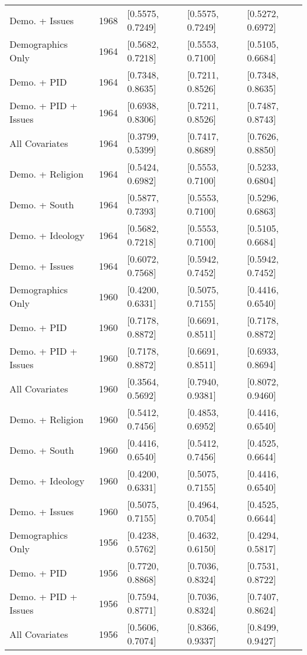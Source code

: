 \begin{longtable}{lrlll}
  Demo. + Issues & 1968 & [0.5575, 0.7249] & [0.5575, 0.7249] & [0.5272, 0.6972] \\ 
  Demographics Only & 1964 & [0.5682, 0.7218] & [0.5553, 0.7100] & [0.5105, 0.6684] \\ 
  Demo. + PID & 1964 & [0.7348, 0.8635] & [0.7211, 0.8526] & [0.7348, 0.8635] \\ 
  Demo. + PID + Issues & 1964 & [0.6938, 0.8306] & [0.7211, 0.8526] & [0.7487, 0.8743] \\ 
  All Covariates & 1964 & [0.3799, 0.5399] & [0.7417, 0.8689] & [0.7626, 0.8850] \\ 
  Demo. + Religion & 1964 & [0.5424, 0.6982] & [0.5553, 0.7100] & [0.5233, 0.6804] \\ 
  Demo. + South & 1964 & [0.5877, 0.7393] & [0.5553, 0.7100] & [0.5296, 0.6863] \\ 
  Demo. + Ideology & 1964 & [0.5682, 0.7218] & [0.5553, 0.7100] & [0.5105, 0.6684] \\ 
  Demo. + Issues & 1964 & [0.6072, 0.7568] & [0.5942, 0.7452] & [0.5942, 0.7452] \\ 
  Demographics Only & 1960 & [0.4200, 0.6331] & [0.5075, 0.7155] & [0.4416, 0.6540] \\ 
  Demo. + PID & 1960 & [0.7178, 0.8872] & [0.6691, 0.8511] & [0.7178, 0.8872] \\ 
  Demo. + PID + Issues & 1960 & [0.7178, 0.8872] & [0.6691, 0.8511] & [0.6933, 0.8694] \\ 
  All Covariates & 1960 & [0.3564, 0.5692] & [0.7940, 0.9381] & [0.8072, 0.9460] \\ 
  Demo. + Religion & 1960 & [0.5412, 0.7456] & [0.4853, 0.6952] & [0.4416, 0.6540] \\ 
  Demo. + South & 1960 & [0.4416, 0.6540] & [0.5412, 0.7456] & [0.4525, 0.6644] \\ 
  Demo. + Ideology & 1960 & [0.4200, 0.6331] & [0.5075, 0.7155] & [0.4416, 0.6540] \\ 
  Demo. + Issues & 1960 & [0.5075, 0.7155] & [0.4964, 0.7054] & [0.4525, 0.6644] \\ 
  Demographics Only & 1956 & [0.4238, 0.5762] & [0.4632, 0.6150] & [0.4294, 0.5817] \\ 
  Demo. + PID & 1956 & [0.7720, 0.8868] & [0.7036, 0.8324] & [0.7531, 0.8722] \\ 
  Demo. + PID + Issues & 1956 & [0.7594, 0.8771] & [0.7036, 0.8324] & [0.7407, 0.8624] \\ 
  All Covariates & 1956 & [0.5606, 0.7074] & [0.8366, 0.9337] & [0.8499, 0.9427] \\ 

\end{longtable}

